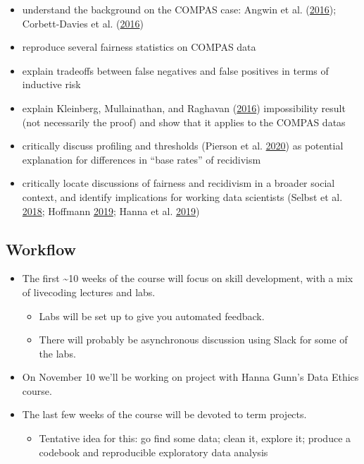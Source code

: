 \documentclass[
]{article}
\providecommand{\tightlist}{%
  \setlength{\itemsep}{0pt}\setlength{\parskip}{0pt}}
\begin{document}
\begin{enumerate}
  \begin{itemize}
  \tightlist
  \item
    understand the background on the COMPAS case: Angwin et al. (\protect\hyperlink{ref-AngwinMachineBiasThere2016}{2016}); Corbett-Davies et al. (\protect\hyperlink{ref-Corbett-DaviesComputerProgramUsed2016}{2016})
  \item
    reproduce several fairness statistics on COMPAS data
  \item
    explain tradeoffs between false negatives and false positives in terms of inductive risk
  \item
    explain Kleinberg, Mullainathan, and Raghavan (\protect\hyperlink{ref-KleinbergInherentTradeOffsFair2016}{2016}) impossibility result (not necessarily the proof) and show that it applies to the COMPAS datas
  \item
    critically discuss profiling and thresholds (Pierson et al. \protect\hyperlink{ref-PiersonLargescaleAnalysisRacial2020}{2020}) as potential explanation for differences in ``base rates'' of recidivism
  \item
    critically locate discussions of fairness and recidivism in a broader social context, and identify implications for working data scientists (Selbst et al. \protect\hyperlink{ref-SelbstFairnessAbstractionSociotechnical2018}{2018}; Hoffmann \protect\hyperlink{ref-HoffmannWhereFairnessFails2019}{2019}; Hanna et al. \protect\hyperlink{ref-HannaCriticalRaceMethodology2019}{2019})
  \end{itemize}
\end{enumerate}

\hypertarget{workflow}{%
\subsection{Workflow}\label{workflow}}

\begin{itemize}
\tightlist
\item
  The first \textasciitilde10 weeks of the course will focus on skill development, with a mix of livecoding lectures and labs.

  \begin{itemize}
  \tightlist
  \item
    Labs will be set up to give you automated feedback.\\
  \item
    There will probably be asynchronous discussion using Slack for some of the labs.
  \end{itemize}
\item
  On November 10 we'll be working on project with Hanna Gunn's Data Ethics course.\\
\item
  The last few weeks of the course will be devoted to term projects.

  \begin{itemize}
  \tightlist
  \item
    Tentative idea for this: go find some data; clean it, explore it; produce a codebook and reproducible exploratory data analysis
  \end{itemize}
\end{itemize}
\end{document}
